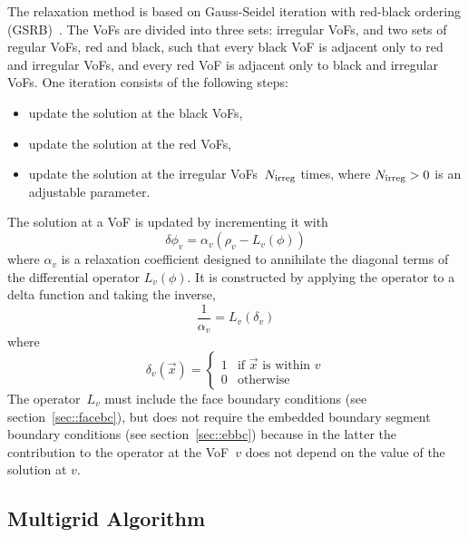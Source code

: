 The relaxation method is based on Gauss-Seidel iteration with
red-black ordering (GSRB)~\cite{}.  The VoFs are divided into three sets:
irregular VoFs, and two sets of regular VoFs, red and black, such that
every black VoF is adjacent only to red and irregular VoFs, and every
red VoF is adjacent only to black and irregular VoFs.  One iteration
consists of the following steps:
\begin{itemize}
\item
update the solution at the black VoFs,

\item
update the solution at the red VoFs,

\item
update the solution at the irregular VoFs~$N_{\mbox{\scriptsize
irreg}}$ times, where $N_{\mbox{\scriptsize irreg}}>0$ is an
adjustable parameter.
\end{itemize}
The solution at a VoF is updated by incrementing it with
\begin{equation}
\delta \phi_v = \alpha_v \left( \rho_v - L_v \left( \phi \right) \right)
\end{equation}
where $\alpha_v$ is a relaxation coefficient designed to annihilate
the diagonal terms of the differential operator $L_v(\phi)$.  It is
constructed by applying the operator to a delta function and taking
the inverse,
\begin{equation}
\frac{1}{\alpha_v} = L_v \left( \delta_v \right)
\end{equation}
where
\begin{equation}
\delta_v\left( \vec{x} \right) = \left\{ \begin{array}{ll}
1 & \mbox{if $\vec{x}$ is within~$v$} \\
0 & \mbox{otherwise}
\end{array} \right.
\end{equation}
The operator~$L_v$ must include the face boundary conditions (see
section~\ref{sec::facebc}), but does not require the embedded boundary
segment boundary conditions (see section~\ref{sec::ebbc}) because in
the latter the contribution to the operator at the VoF~$v$ does not
depend on the value of the solution at $v$.


\subsection{Multigrid Algorithm}
\label{sec::mg}

